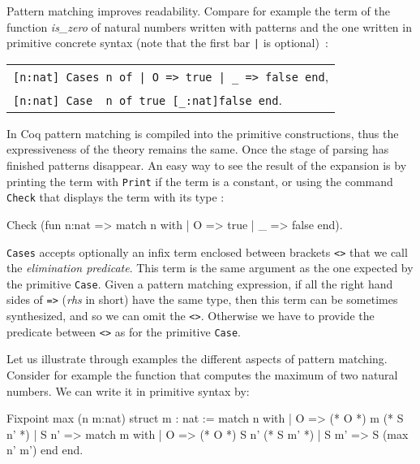 Pattern matching  improves readability. Compare for example the term
of the  function {\em is\_zero} of natural 
numbers written with patterns and the one written in primitive
concrete syntax (note that the first bar \verb+|+ is optional)~:

\begin{center}
\begin{small}
\begin{tabular}{l}
\verb+[n:nat] Cases n of | O => true | _ => false end+,\\ 
\verb+[n:nat] Case  n of true [_:nat]false end+.
\end{tabular}
\end{small}
\end{center}

In Coq pattern matching is compiled into the primitive constructions,
thus the expressiveness of the theory remains the same. Once the stage
of parsing has finished patterns disappear. An easy way to see the
result of the expansion is by printing the term with \texttt{Print} if
the term is a constant, or
using the command \texttt{Check}  that displays
the term with its type :

\begin{coq_example}
Check (fun n:nat => match n with
                    | O => true
                    | _ => false
                    end).
\end{coq_example}


\verb+Cases+ accepts optionally an infix term enclosed between
brackets \verb+<>+ that we
call the {\em elimination predicate}. 
This term is the same argument as the one expected by the primitive
\verb+Case+. Given a pattern matching
expression, if all the right hand sides of \verb+=>+ ({\em rhs} in
short) have the same type, then this term
can be sometimes synthesized, and so we can omit the \verb+<>+.
Otherwise we have to
provide the predicate between \verb+<>+ as for the primitive \verb+Case+.

Let us illustrate through examples the different aspects of pattern matching.
Consider for example the function that computes the maximum of two
natural numbers.  We can write it in primitive syntax by:
\begin{coq_example}
Fixpoint max (n m:nat) {struct m} : nat :=
  match n with
  | O => 
      (*  O   *) m
      (* S n' *) 
  | S n' =>
      match m with
      | O => 
          (* O    *) S n'
          (* S m' *) 
      | S m' => S (max n' m')
      end
  end.
\end{coq_example}

